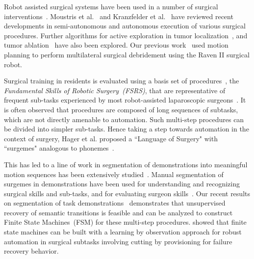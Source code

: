 Robot assisted surgical systems have been used in a number of surgical interventions~\cite{Taylor2008,alterovitz2008motion,Wolf2009,Beasley2012}.
Moustris et al.~\cite{Moustris2011} and Kranzfelder et al.~\cite{kranzfelder2013toward} have reviewed recent developments in semi-autonomous and autonomous execution of various surgical procedures. 
Further algorithms for active exploration in tumor localization~\cite{Nichols2013Autonomous}, and tumor ablation~\cite{Hu2015Semi} have also been explored. Our previous work~\cite{Kehoe2014Autonomous} used motion planning to perform multilateral surgical debridement using the Raven II surgical robot.

Surgical training in residents is evaluated using a basis set of  procedures~\cite{stegemann2013fundamental}, the \textit{Fundamental Skills of Robotic Surgery~(FSRS)}, that are representative of frequent sub-tasks experienced by most robot-assisted laparoscopic surgeons~\cite{Ritter2007,dulan2012developing, stegemann2013fundamental}. 
It is often observed that procedures are composed of long sequences of subtasks, which are not directly amenable to automation.
Such multi-step procedures can be divided into simpler sub-tasks. 
Hence taking a step towards automation in the context of surgery, Hager et al. proposed a ``Language of Surgery" with ``surgemes" analogous to phonemes~\cite{Lin2006,Reiley2009,Varadarajan2009}.

This has led to a line of work in segmentation of demonstrations into meaningful motion sequences has been extensively studied~\cite{Konidaris2011,Niekum2015,Gienger2010, lea2015improved}. Manual segmentation of surgemes in demonstrations have been used for understanding and recognizing surgical skills and sub-tasks, and for evaluating surgeon skills~\cite{Reiley2009,Varadarajan2009}.
Our recent results on segmentation of task demonstrations~\cite{krishnan2015tsc} demonstrates that unsupervised recovery of semantic transitions is feasible and can be analyzed to construct Finite State Machines~(FSM) for these multi-step procedures.
\citet{Murali2015Learning} showed that finite state machines can be built with a learning by observation approach for robust automation in surgical subtasks involving cutting by provisioning for failure recovery behavior.

